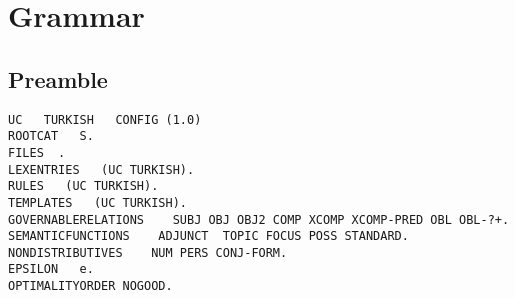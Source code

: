 \section{Grammar}
\label{appendixc:grammar}
\subsection{Preamble}
\label{appendixc:preamble}

\begin{lstlisting}
UC   TURKISH   CONFIG (1.0)
ROOTCAT   S.
FILES  .
LEXENTRIES   (UC TURKISH).
RULES   (UC TURKISH).
TEMPLATES   (UC TURKISH).
GOVERNABLERELATIONS    SUBJ OBJ OBJ2 COMP XCOMP XCOMP-PRED OBL OBL-?+.
SEMANTICFUNCTIONS    ADJUNCT  TOPIC FOCUS POSS STANDARD.
NONDISTRIBUTIVES    NUM PERS CONJ-FORM.
EPSILON   e.
OPTIMALITYORDER NOGOOD.

\end{lstlisting}

